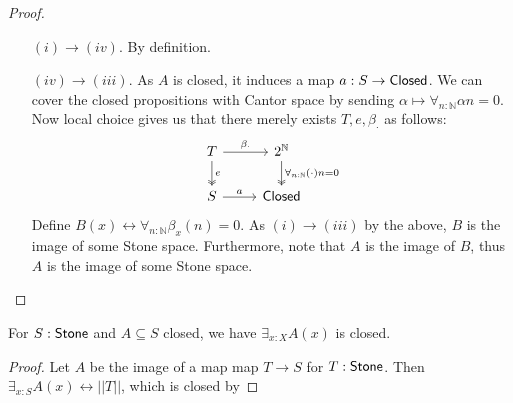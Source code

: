 \begin{proof}
\begin{itemize}
%
%
%
%
%
%
%
   \item [$(i) \to (iv)$.] By definition.
   \item[$(iv) \to (iii)$.]
     As $A$ is closed, it induces a map $a:S\to \mathsf{Closed}$. 
     We can cover the closed propositions with Cantor space
     by sending 
     $\alpha \mapsto \forall_{n:\mathbb N} \alpha n = 0.$
     Now local choice gives us that there merely exists $T, e, \beta_\cdot$ as follows:
     \begin{equation}
       \begin{tikzcd}
         T \arrow[r,"\beta_\cdot"] \arrow[d, two heads,"e"] & 2^\mathbb N 
         \arrow[d,two heads, "\forall_{n:\mathbb N} (\cdot)n = 0"] \\
         S \arrow[r,"a"] & \Closed
       \end{tikzcd} 
     \end{equation} 
     Define $B(x) \leftrightarrow \forall_{n:\mathbb N} \beta_x(n) = 0$. 
     As $(i) \to (iii)$ by the above, $B$ is the image of some Stone space. 
     Furthermore, note that $A$ is the image of $B$, thus $A$ is the image of some Stone space. 
\end{itemize} 
\end{proof} 


\begin{corollary}\label{InhabitedClosedSubSpaceClosed}
  For $S:\mathsf{Stone}$ and $A\subseteq S$ closed, we have 
  $\exists_{x:X} A(x)$ is closed. 
\end{corollary}
\begin{proof}
  Let $A$ be the image of a map map $T\to S$ for $T:\mathsf{Stone}$. 
  Then $\exists_{x:S} A(x) \leftrightarrow ||T||$, which is closed by 
\end{proof}

